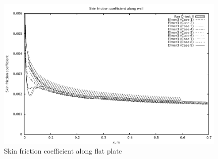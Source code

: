 %
\begin{figure}[h]
 \begin{center}
  \includegraphics[width=12.5cm]{./chap2-flat-plate/figs/coles-x-cf.pdf}
 \end{center}
 \caption{Skin friction coefficient along flat plate}
 \label{flat-plate-cf}
\end{figure}

